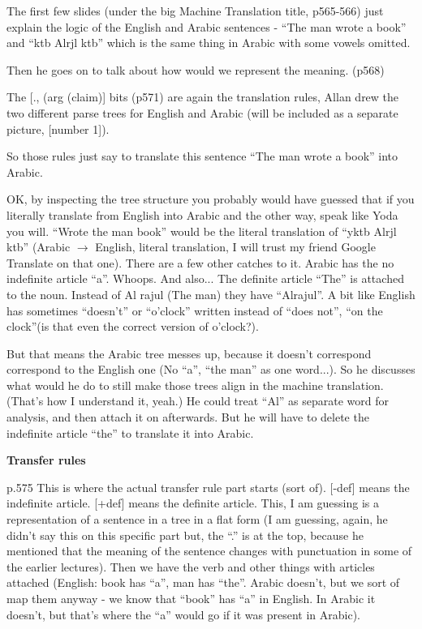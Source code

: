 The first few slides (under the big Machine Translation title, p565-566) just
explain the logic of the English and Arabic sentences - ``The man wrote a book''
and ``ktb Alrjl ktb'' which is the same thing in Arabic with some vowels
omitted.

Then he goes on to talk about how would we represent the meaning. (p568)

The [., (arg (claim)] bits (p571) are again the translation rules, Allan drew
the two different parse trees for English and Arabic (will be included as a
separate picture, [number 1]).

So those rules just say to translate this sentence ``The man wrote a book'' into
Arabic.

OK, by inspecting the tree structure you probably would have guessed that if you
literally translate from English into Arabic and the other way, speak like Yoda
you will. ``Wrote the man book'' would be the literal translation of ``yktb
Alrjl ktb'' (Arabic $\rightarrow$ English, literal translation, I will trust my
friend Google Translate on that one). There are a few other catches to it.
Arabic has the no indefinite article ``a''. Whoops. And also... The definite
article ``The'' is attached to the noun. Instead of Al rajul (The man) they have
``Alrajul''. A bit like English has sometimes ``doesn't'' or ``o'clock'' written
instead of ``does not'', ``on the clock''(is that even the correct version of
o'clock?).

But that means the Arabic tree messes up, because it doesn't correspond
correspond to the English one (No ``a'', ``the man'' as one word...). So he
discusses what would he do to still make those trees align in the machine
translation. (That's how I understand it, yeah.) He could treat ``Al'' as
separate word for analysis, and then attach it on afterwards. But he will have
to delete the indefinite article ``the'' to translate it into Arabic.

\textbf{Transfer rules}

p.575 This is where the actual transfer rule part starts (sort of). [-def] means
the indefinite article. [+def] means the definite article. This, I am guessing
is a representation of a sentence in a tree in a flat form (I am guessing,
again, he didn't say this on this specific part but, the ``.'' is at the top,
because he mentioned that the meaning of the sentence changes with punctuation
in some of the earlier lectures). Then we have the verb and other things with
articles attached (English: book has ``a'', man has ``the''. Arabic doesn't, but
we sort of map them anyway - we know that ``book'' has ``a'' in English. In
Arabic it doesn't, but that's where the ``a'' would go if it was present in
Arabic).

